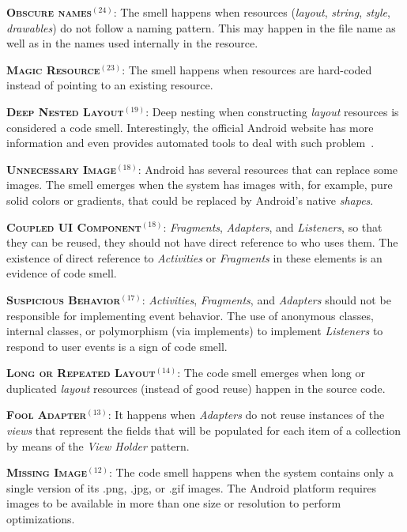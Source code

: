 \noindent
\textbf{\textsc{{\small Obscure names}}}$^{(24)}$:
The smell happens when resources (\textit{layout}, \textit{string}, \textit{style}, \textit{drawables}) do not follow a naming pattern. This may happen in the file name as well as in the names used internally in the resource. 


\noindent
\textbf{\textsc{{\small Magic Resource}}}$^{(23)}$:
The smell happens when resources are hard-coded instead of pointing
to an existing resource.


\noindent
\textbf{\textsc{{\small Deep Nested Layout}}}$^{(19)}$:
Deep nesting when constructing \textit{layout} resources is considered 
a code smell. Interestingly, the official Android website has more
information and even provides automated tools to deal with such
problem~\cite{OptmizingViewHierarchies}.

\noindent
\textbf{\textsc{{\small Unnecessary Image}}}$^{(18)}$:
Android has several resources that can replace some images. The smell
emerges when the system has images with, for example, 
pure solid colors or gradients, that could be replaced by
Android's native \textit{shapes}.

\noindent
\textbf{\textsc{{\small Coupled UI Component}}}$^{(18)}$: \textit{Fragments}, \textit{Adapters}, and \textit{Listeners}, so that they can be reused, they should not have direct reference to who uses them. The existence of direct reference to \textit{Activities} or \textit{Fragments} in these elements is an evidence of code smell.

\noindent
\textsc{\textbf{{\small Suspicious Behavior}}}$^{(17)}$: \textit{Activities}, \textit{Fragments}, and \textit{Adapters} should not be responsible for implementing event behavior. The use of anonymous classes, internal classes, or polymorphism (via implements) to implement \textit{Listeners} to respond to user events is a sign of code smell.
 

\noindent
\textbf{\textsc{{\small Long or Repeated Layout}}}$^{(14)}$:
The code smell emerges when 
long or duplicated \textit{layout} resources (instead of good reuse) 
happen in the source code.


\noindent
\textsc{\textbf{{\small Fool Adapter}}}$^{(13)}$: 
It happens when \textit{Adapters} do not reuse instances of the \textit{views} that
represent the fields that will be populated for each item of a collection by means
of the \textit{View Holder} pattern. 

\noindent
\textbf{\textsc{{\small Missing Image}}}$^{(12)}$:
The code smell happens when the system contains only a single
version of its .png, .jpg, or .gif images. The Android platform
requires images to be available in more than one size or resolution
to perform optimizations.


